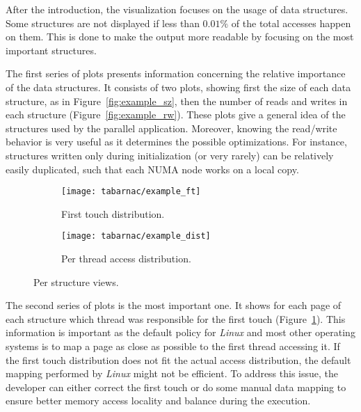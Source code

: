After the introduction, the visualization focuses on the usage of data structures. Some
structures are not displayed if less than $0.01\%$ of the total accesses happen on them. This is
done to make the output more readable by focusing on the most important structures.

The first series of plots presents information concerning the relative
importance of the data structures. It consists of two plots, showing first the
size of each data structure, as in Figure~\ref{fig:example_sz}, then the
number of reads and writes in each structure (Figure~\ref{fig:example_rw}). These plots give a
general idea of the structures used by the parallel application.
Moreover, knowing the read/write behavior is very
useful as it determines the possible optimizations. For instance, structures
written only during initialization (or very rarely) can be relatively easily
duplicated, such that each NUMA node works on a local copy.

\begin{figure}[htb]
    \centering
    \begin{subfigure}{.49\linewidth}
        \texttt{[image: tabarnac/example\_ft]}
        \caption{First touch distribution.}
        \label{fig:example_ft}
    \end{subfigure}
    \begin{subfigure}{.49\linewidth}
        \texttt{[image: tabarnac/example\_dist]}
        \caption{Per thread access distribution.}
        \label{fig:example_dist}
    \end{subfigure}
    \caption{Per structure views.}
    \label{fig:example_by_structs}
\end{figure}

The second series of plots is the most important one. It
shows for each page of each structure
which thread was responsible for the first touch
(Figure~\ref{fig:example_ft}). This information is important as the
default policy for \emph{Linux} and most other operating systems is to map a page as close as possible to the first
thread accessing it. If the first touch distribution does not fit the actual
access distribution, the default mapping performed by \emph{Linux} might not be
efficient. To address this issue, the developer can either correct the first
touch or do some manual data mapping to ensure better memory access locality and balance
during the execution.

